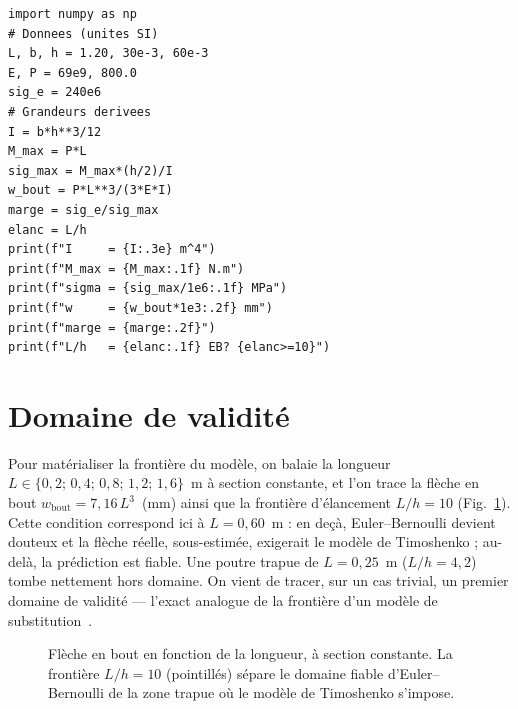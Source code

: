 \documentclass[10pt,journal]{IEEEtran}
\begin{document}
\begin{lstlisting}[caption={Vérification analytique en Python / numpy. La conversion SI est faite dès la déclaration des données.},label={lst:py},float=!t]
import numpy as np
# Donnees (unites SI)
L, b, h = 1.20, 30e-3, 60e-3
E, P = 69e9, 800.0
sig_e = 240e6
# Grandeurs derivees
I = b*h**3/12
M_max = P*L
sig_max = M_max*(h/2)/I
w_bout = P*L**3/(3*E*I)
marge = sig_e/sig_max
elanc = L/h
print(f"I     = {I:.3e} m^4")
print(f"M_max = {M_max:.1f} N.m")
print(f"sigma = {sig_max/1e6:.1f} MPa")
print(f"w     = {w_bout*1e3:.2f} mm")
print(f"marge = {marge:.2f}")
print(f"L/h   = {elanc:.1f} EB? {elanc>=10}")
\end{lstlisting}

\section{Domaine de validité}
Pour matérialiser la frontière du modèle, on balaie la longueur $L \in \{0{,}2;\,0{,}4;\,0{,}8;\,1{,}2;\,1{,}6\}$~m à section constante, et l'on trace la flèche en bout $w_{\text{bout}}=7{,}16\,L^3$~(mm) ainsi que la frontière d'élancement $L/h=10$ (Fig.~\ref{fig:domaine}). Cette condition correspond ici à $L=0{,}60$~m : en deçà, Euler--Bernoulli devient douteux et la flèche réelle, sous-estimée, exigerait le modèle de Timoshenko ; au-delà, la prédiction est fiable. Une poutre trapue de $L=0{,}25$~m ($L/h=4{,}2$) tombe nettement hors domaine. On vient de tracer, sur un cas trivial, un premier domaine de validité --- l'exact analogue de la frontière d'un modèle de substitution~\cite{forrester}.

\begin{figure}[!t]
\centering
{}
\caption{Flèche en bout en fonction de la longueur, à section constante. La frontière $L/h=10$ (pointillés) sépare le domaine fiable d'Euler--Bernoulli de la zone trapue où le modèle de Timoshenko s'impose.}
\label{fig:domaine}
\end{figure}
\end{document}
